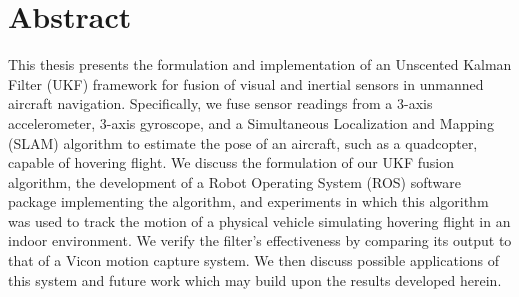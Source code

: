 \chapter*{Abstract}


This thesis presents the formulation and implementation of an Unscented Kalman Filter (UKF) framework for fusion of visual and inertial sensors in unmanned aircraft navigation. Specifically, we fuse sensor readings from a 3-axis accelerometer, 3-axis gyroscope, and a Simultaneous Localization and Mapping (SLAM) algorithm to estimate the pose of an aircraft, such as a quadcopter, capable of hovering flight. We discuss the formulation of our UKF fusion algorithm, the development of a Robot Operating System (ROS) software package implementing the algorithm, and experiments in which this algorithm was used to track the motion of a physical vehicle simulating hovering flight in an indoor environment. We verify the filter's effectiveness by comparing its output to that of a Vicon motion capture system. We then discuss possible applications of this system and future work which may build upon the results developed herein.